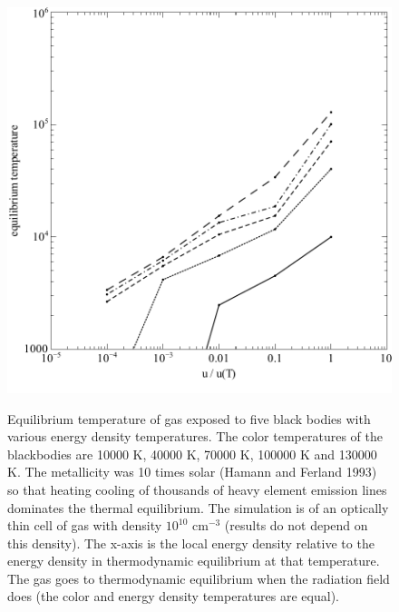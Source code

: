\begin{figure}
\centering
\includegraphics[scale=0.9]{HighMetalsLTE}
\label{fig:HighMetalsLTE}
\caption[High metallicity gas approach to LTE]
{Equilibrium temperature of gas exposed to five black bodies with
various energy density temperatures.  The color temperatures of the
blackbodies are 10000 K, 40000 K, 70000 K, 100000 K and 130000 K.  The
metallicity was 10 times solar (Hamann and Ferland 1993) so that heating
cooling of thousands of heavy element emission lines dominates the thermal
equilibrium.  The simulation is of an optically thin cell of gas with density
$10^{10}$ cm$^{-3}$ (results do not depend on this density).  The x-axis is the local
energy density relative to the energy density in thermodynamic equilibrium
at that temperature.  The gas goes to thermodynamic equilibrium when the
radiation field does (the color and energy density temperatures are equal).}
\end{figure}

